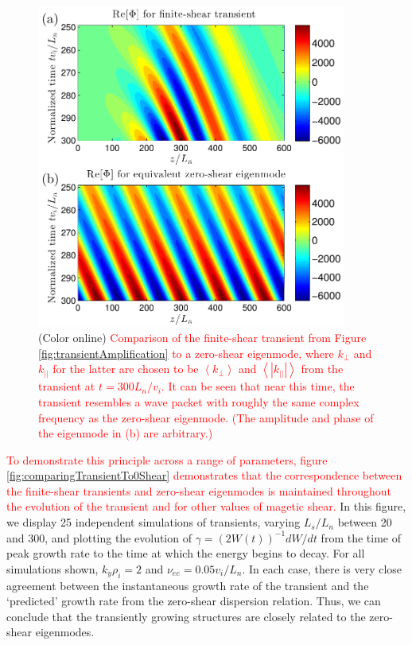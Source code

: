 \documentclass[12pt,superscriptaddress]{revtex4}
\newcommand{\nuee}{\nu_{ee}}
\newcommand{\changed}[1]{\textcolor{red}{#1}}
\begin{document}
\begin{figure}[h!]
\includegraphics[width=4in]{m20150222_01_plotGS2TransientAmplificationVs0ShearEigenmode.pdf}
\caption{(Color online)
\changed{
Comparison of the finite-shear transient from Figure \ref{fig:transientAmplification} to a
zero-shear eigenmode, where $k_{\perp}$ and $k_{||}$ for the latter are chosen to be $\left<k_{\perp}\right>$ and $\left<|k_{||}|\right>$
from the transient at $t=300 L_n/v_i$.
It can be seen that near this time, the transient resembles a wave packet with roughly the same
complex frequency as the zero-shear eigenmode.
(The amplitude and phase of the eigenmode in (b) are arbitrary.)
}
\label{fig:comparingTransientTo0Shear_single}}
\end{figure}

\changed{
To demonstrate this principle across a range of parameters,
figure  \ref{fig:comparingTransientTo0Shear} demonstrates that the
correspondence between the finite-shear transients and zero-shear eigenmodes
is maintained throughout the evolution of the transient and for other
values of magetic shear.}
In this figure, we display 25 independent simulations of transients,
varying $L_s/L_n$ between 20 and 300, and plotting the evolution of $\gamma = (2W(t))^{-1} dW/dt$ from the time
of peak growth rate to the time at which the energy begins to decay.
For all simulations shown, $k_y \rho_i = 2$ and $\nuee = 0.05 v_i/L_n$.
In each case, there is very close agreement between the instantaneous growth rate of the transient
and the `predicted' growth rate from the zero-shear dispersion relation.
Thus, we can conclude that the transiently growing structures are closely related to the zero-shear
eigenmodes.  
\end{document}
